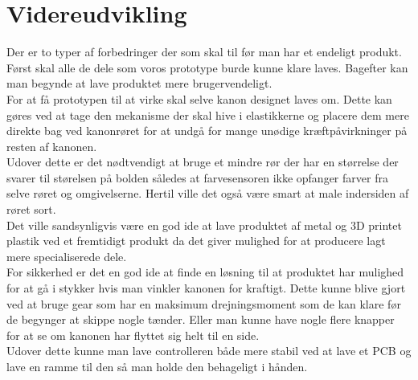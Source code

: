 \section{Videreudvikling}
Der er to typer af forbedringer der som skal til før man har et endeligt produkt. Først skal alle de dele som voros prototype burde kunne klare laves. Bagefter kan man begynde at lave produktet mere brugervendeligt.\\

For at få prototypen til at virke skal selve kanon designet laves om. Dette kan gøres ved at tage den mekanisme der skal hive i elastikkerne og placere dem mere direkte bag ved kanonrøret for at undgå for mange unødige kræftpåvirkninger på resten af kanonen.\\
Udover dette er det nødtvendigt at bruge et mindre rør der har en størrelse der svarer til størelsen på bolden således at farvesensoren ikke opfanger farver fra selve røret og omgivelserne. Hertil ville det også være smart at male indersiden af røret sort.\\
Det ville sandsynligvis være en god ide at lave produktet af metal og 3D printet plastik ved et fremtidigt produkt da det giver mulighed for at producere lagt mere specialiserede dele. \\
For sikkerhed er det en god ide at finde en løsning til at produktet har mulighed for at gå i stykker hvis man vinkler kanonen for kraftigt. Dette kunne blive gjort ved at bruge gear som har en maksimum drejningsmoment som de kan klare før de begynger at skippe nogle tænder. Eller man kunne have nogle flere knapper for at se om kanonen har flyttet sig helt til en side.\\
Udover dette kunne man lave controlleren både mere stabil ved at lave et PCB og lave en ramme til den så man holde den behageligt i hånden.
